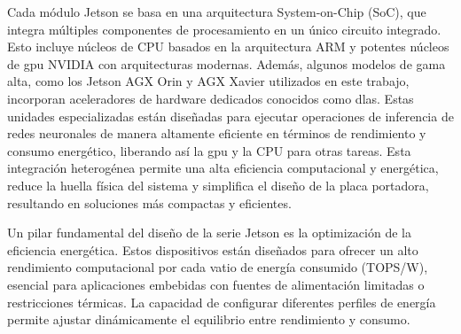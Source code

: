 \documentclass[11pt,spanish,listoffigures,listoftables]{tfgetsinf}
\begin{document}
Cada módulo Jetson se basa en una arquitectura System-on-Chip (SoC), que integra múltiples componentes de procesamiento en un único circuito integrado. Esto incluye núcleos de CPU basados en la arquitectura ARM y potentes núcleos de \gls{gpu} NVIDIA con arquitecturas modernas. Además, algunos modelos de gama alta, como los Jetson AGX Orin y AGX Xavier utilizados en este trabajo, incorporan aceleradores de hardware dedicados conocidos como \glspl{dla}. Estas unidades especializadas están diseñadas para ejecutar operaciones de inferencia de redes neuronales de manera altamente eficiente en términos de rendimiento y consumo energético, liberando así la \gls{gpu} y la CPU para otras tareas. Esta integración heterogénea permite una alta eficiencia computacional y energética, reduce la huella física del sistema y simplifica el diseño de la placa portadora, resultando en soluciones más compactas y eficientes.

Un pilar fundamental del diseño de la serie Jetson es la optimización de la eficiencia energética. Estos dispositivos están diseñados para ofrecer un alto rendimiento computacional por cada vatio de energía consumido (TOPS/W), esencial para aplicaciones embebidas con fuentes de alimentación limitadas o restricciones térmicas. La capacidad de configurar diferentes perfiles de energía permite ajustar dinámicamente el equilibrio entre rendimiento y consumo.
\end{document}
